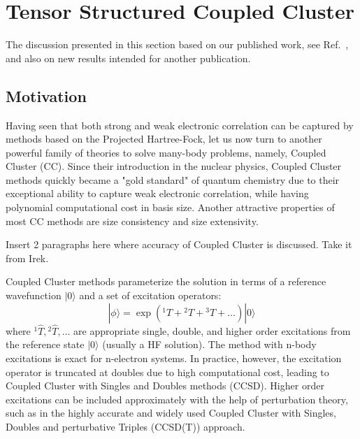 \chapter{Tensor Structured Coupled Cluster}
\label{ch:tcc} 
The discussion presented in this section based on our published work, see 
Ref.~\cite{schutski2017tensor}, and also on new results intended for another 
publication.

\section{Motivation}
\label{sec:Introduction} 
Having seen that both strong and weak electronic correlation can be captured 
by methods based on the Projected Hartree-Fock, let us now turn to another 
powerful family of theories to solve many-body problems, namely, Coupled 
Cluster (CC). Since their introduction in the nuclear 
physics,\cite{coester1958bound, coester1960short} Coupled Cluster methods 
quickly became a "gold standard" of quantum chemistry due to their exceptional 
ability to capture weak electronic correlation, while having polynomial 
computational cost in basis size. Another attractive properties of most CC 
methods are size consistency and size extensivity.\cite{pople1978electron, 
bartlett1978many, crawford2000introduction, bartlett2007coupled} 

{\color{red} Insert 2 paragraphs here where accuracy of Coupled Cluster is 
discussed. Take it from Irek.}

Coupled Cluster methods parameterize the solution in terms of a reference 
wavefunction $| 0 \rangle$ and a set of excitation operators:
\begin{equation}
 | \phi \rangle  = \exp({}^1\hat{T} + {}^2\hat{T} + {}^3\hat{T} + \ldots) | 0 
\rangle
\end{equation}
where ${}^1\hat{T}, {}^2\hat{T}, \ldots$ are appropriate single, double, and 
higher order excitations from the reference state $| 0 \rangle$ (usually a HF 
solution). The method with n-body excitations is exact for n-electron systems. 
In practice, however, the excitation operator is truncated at doubles due to 
high computational cost, leading to Coupled Cluster with Singles and Doubles 
methods (CCSD).\cite{purvis1982full} Higher order excitations can be included 
approximately with the help of perturbation theory, such as in the highly 
accurate and widely used Coupled Cluster with Singles, Doubles and 
perturbative Triples (CCSD(T)) approach.\cite{bartlett1990non}

